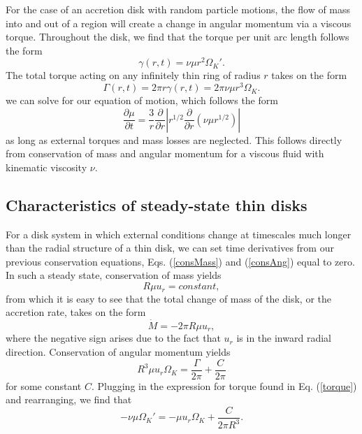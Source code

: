 \documentclass[aps,pra,twocolumn]{revtex4-1}
\begin{document}
For the case of an accretion disk with random particle motions, the flow of mass into and out of a region will create a change in angular momentum via a viscous torque.  Throughout the disk, we find that the torque per unit arc length follows the form \cite{king2002}
\begin{equation}
\gamma(r, t) = \nu \mu r^2 \Omega_K'.
\end{equation}
The total torque acting on any infinitely thin ring of radius $r$ takes on the form 
\begin{equation}
\Gamma(r, t) = 2 \pi r \gamma(r, t) = 2 \pi \nu \mu r^3 \Omega_K. \label{torque}
\end{equation}
we can solve for our equation of motion, which follows the form 
\begin{equation}
\frac{\partial \mu}{\partial t} = \frac{3}{r} \frac{\partial}{\partial r} \left| r^{1/2}\frac{\partial}{\partial r}\left( \nu \mu r^{1/2} \right) \right|
\end{equation}
as long as external torques and mass losses are neglected\cite{king2002, armitage2011}.  This follows directly from conservation of mass and angular momentum for a viscous fluid with kinematic viscosity $\nu$.


\subsection{\label{section 2.2} Characteristics of steady-state thin disks}
For a disk system in which external conditions change at timescales much longer than the radial structure of a thin disk, we can set time derivatives from our previous conservation equations, Eqs. (\ref{consMass}) and (\ref{consAng}) equal to zero.  In such a steady state, conservation of mass yields
\begin{equation}
R\mu u_r = constant, \nonumber
\end{equation}
from which it is easy to see that the total change of mass of the disk, or the accretion rate, takes on the form
\begin{equation}
\dot{M} = -2\pi R \mu u_r, \label{modifiedMass1}
\end{equation}
where the negative sign arises due to the fact that $u_r$ is in the inward radial direction.  Conservation of angular momentum yields
\begin{equation}
R^3 \mu u_r \Omega_K = \frac{\Gamma}{2\pi} + \frac{C}{2\pi} \nonumber
\end{equation}
for some constant $C$.  Plugging in the expression for torque found in Eq. (\ref{torque}) and rearranging, we find that \cite{king2002}
\begin{equation}
- \nu \mu \Omega_K' = -\mu u_r \Omega_K  + \frac{C}{2\pi R^3 }. \label{modifiedAng1}
\end{equation}
\end{document}
